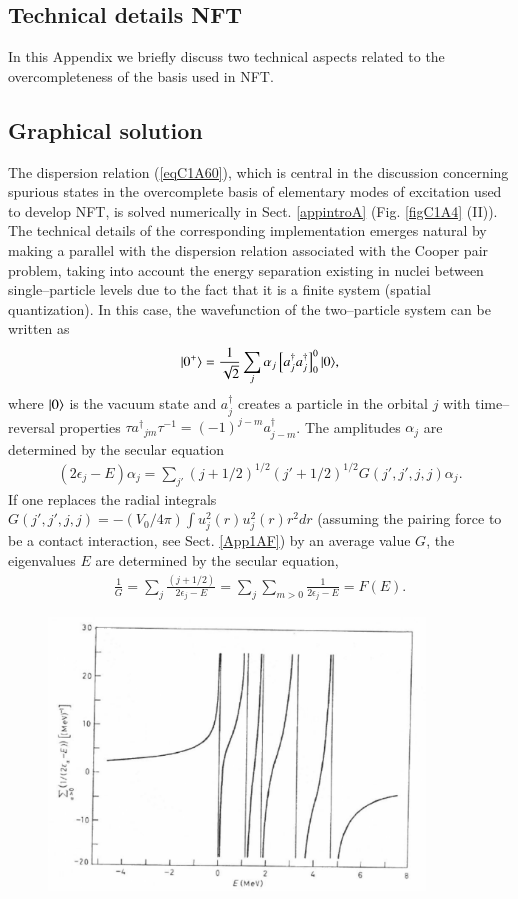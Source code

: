 \begin{subappendices}
\section{Technical details NFT}\label{App1.C}
In this Appendix we briefly discuss two technical aspects related to the overcompleteness of the basis used in NFT.
\subsection{Graphical solution}
The dispersion relation (\ref{eqC1A60}), which is central in the discussion concerning spurious states in the overcomplete basis of elementary modes of excitation used to develop NFT, is solved numerically in Sect. \ref{appintroA} (Fig. \ref{figC1A4} (II)). The technical details of the corresponding implementation emerges natural by making a parallel with the dispersion relation associated with the Cooper pair problem, taking into account the energy  separation existing in nuclei between single--particle levels due to the fact that it is a finite system (spatial quantization). In this case, the wavefunction of the two--particle system can be written as 
\begin{align}\label{eq1.C.1}
|{0^+} \rangle=\frac{1}{\sqrt{2}}\sum_j\alpha_j\left[a^\dagger_j a^\dagger_j\right]^0_0|{0} \rangle,
\end{align}
where $|{0} \rangle$ is the vacuum state and $a^\dagger_j$ creates a particle in the orbital $j$ with time--reversal properties $\tau a{^\dagger}_{jm}\tau^{-1}=(-1)^{j-m}a^\dagger_{j-m}$. The amplitudes $\alpha_j$ are determined by the secular equation  
\begin{align}\label{eq1.C.2}
(2\epsilon_j-E)\alpha_j=\sum_{j'}(j+1/2)^{1/2}(j'+1/2)^{1/2}G(j',j',j,j)\alpha_j.
\end{align}
If one replaces the radial integrals $G(j',j',j,j)=-(V_0/4\pi)\int u_j^2(r)u^2_j(r)r^2dr$ (assuming the pairing force to be a contact interaction, see Sect.  \ref{App1AF}) by an average value $G$, the eigenvalues $E$ are determined by the secular equation,
\begin{align}\label{eq1.C.3}
\frac{1}{G}=\sum_j\frac{(j+1/2)}{2\epsilon_j-E}=\sum_j\sum_{m>0}\frac{1}{2\epsilon_j-E}=F(E).
\end{align}
\begin{figure}
\centerline {
\includegraphics*[width=10cm]{introduccion/figs/fig1C1}
}
\end{figure}
\end{subappendices}
